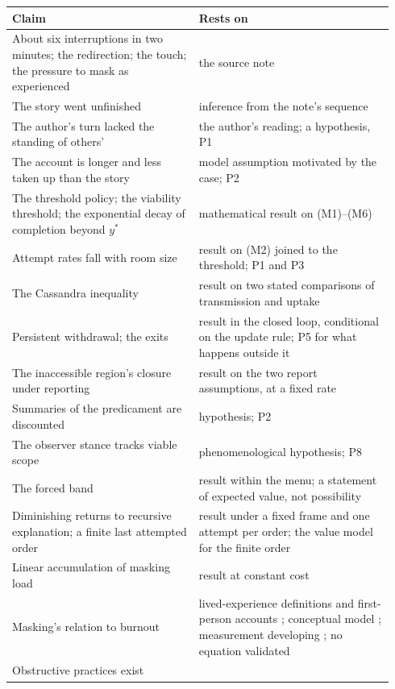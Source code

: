 \begin{center}\small
\begin{tabular}{p{0.46\linewidth} p{0.48\linewidth}}
\toprule
Claim & Rests on \\
\midrule
About six interruptions in two minutes; the redirection; the touch; the pressure to mask as experienced & the source note \\
The story went unfinished & inference from the note's sequence \\
The author's turn lacked the standing of others' & the author's reading; a hypothesis, P1 \\
The account is longer and less taken up than the story & model assumption motivated by the case; P2 \\
The threshold policy; the viability threshold; the exponential decay of completion beyond $y^{*}$ & mathematical result on (M1)--(M6) \\
Attempt rates fall with room size & result on (M2) joined to the threshold; P1 and P3 \\
The Cassandra inequality & result on two stated comparisons of transmission and uptake \\
Persistent withdrawal; the exits & result in the closed loop, conditional on the update rule; P5 for what happens outside it \\
The inaccessible region's closure under reporting & result on the two report assumptions, at a fixed rate \\
Summaries of the predicament are discounted & hypothesis; P2 \\
The observer stance tracks viable scope & phenomenological hypothesis; P8 \\
The forced band & result within the menu; a statement of expected value, not possibility \\
Diminishing returns to recursive explanation; a finite last attempted order & result under a fixed frame and one attempt per order; the value model for the finite order \\
Linear accumulation of masking load & result at constant cost \\
Masking's relation to burnout & lived-experience definitions and first-person accounts \cite{Raymaker2020, Higgins2021, Mantzalas2022b}; conceptual model \cite{Mantzalas2022a}; measurement developing \cite{Mantzalas2024}; no equation validated \\
Obstructive practices exist & \cite{Silver2025, Black2023, Crompton2020b} \\

\end{tabular}
\end{center}
